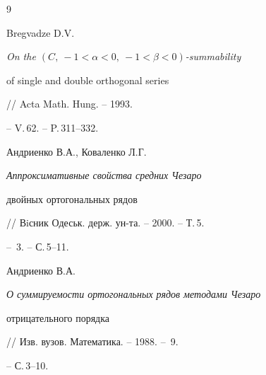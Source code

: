 \begin{thebibliography}{9}







Bregvadze D.V. {\em On the $(C,\ -1<\alpha< 0,\ -1<\beta <0)$-summability


of single and double orthogonal series} // Acta Math. Hung. -- 1993.


-- V.\,62. -- P.\,311--332.







Андриенко В.А., Коваленко Л.Г. {\em Аппроксимативные свойства средних Чезаро


двойных ортогональных рядов} // Вiсник Одеськ. держ. ун-та. -- 2000. -- Т.\,5.


-- \No\,3. -- С.\,5--11.







Андриенко В.А. {\em О суммируемости ортогональных рядов методами Чезаро


отрицательного порядка} // Изв. вузов. Математика. -- 1988. -- \No\,9.


-- С.\,3--10.





\end{thebibliography}





\vskip 2cm












\label{end}





